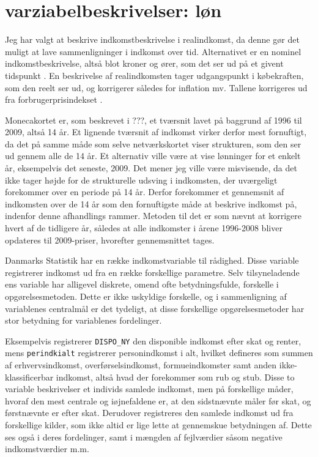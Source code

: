 
\newpage \section{varziabelbeskrivelser: løn \label{app_loen}}

Jeg har valgt at beskrive indkomstbeskrivelse i realindkomst, da denne gør det muligt at lave sammenligninger i indkomst over tid. Alternativet er en nominel indkomstbeskrivelse, altså blot kroner og ører, som det ser ud på et givent tidspunkt \parencite[6]{DST2009}. 
En beskrivelse af realindkomsten tager udgangspunkt i købekraften, som den reelt ser ud, og korrigerer således for inflation mv. Tallene korrigeres ud fra forbrugerprisindekset \parencite{DSTPRISINDEKS}. 

Monecakortet er, som beskrevet i ???, et tværsnit lavet på baggrund af 1996 til 2009, altså 14 år. Et lignende tværsnit af indkomst virker derfor mest fornuftigt, da det på samme måde som selve netværkskortet viser strukturen, som den ser ud gennem alle de 14 år. Et alternativ ville være at vise lønninger for et enkelt år, eksempelvis det seneste, 2009. Det mener jeg ville være misvisende, da det ikke tager højde for de strukturelle udsving i indkomsten, der uværgeligt forekommer over en periode på 14 år. Derfor forekommer et gennemsnit af indkomsten over de 14 år som den fornuftigste måde at beskrive indkomst på, indenfor denne afhandlings rammer. Metoden til det er som nævnt at korrigere hvert af de tidligere år, således at alle indkomster i årene 1996-2008 bliver opdateres til 2009-priser, hvorefter gennemsnittet tages. 

Danmarks Statistik har en række indkomstvariable til rådighed. Disse variable registrerer indkomst ud fra en række forskellige parametre. Selv tilsyneladende ens variable har alligevel diskrete, omend ofte betydningsfulde, forskelle i opgørelsesmetoden. Dette er ikke uskyldige forskelle, og i sammenligning af variablenes centralmål er det tydeligt, at disse forskellige opgørelsesmetoder har stor betydning for variablenes fordelinger.

Eksempelvis registrerer \texttt{DISPO\_NY} den disponible indkomst efter skat og renter, mens \texttt{perindkialt} registrerer personindkomst i alt, hvilket defineres som summen af erhvervsindkomst, overførselsindkomst, formueindkomster samt anden ikke-klassificerbar indkomst, altså hvad der forekommer som rub og stub. Disse to variable beskrivelser et individs samlede indkomst, men på forskellige måder, hvoraf den mest centrale og iøjnefaldene er, at den sidstnævnte måler før skat, og førstnævnte er efter skat. Derudover registreres den samlede indkomst ud fra forskellige kilder, som ikke altid er lige lette at gennemskue betydningen af. Dette ses også i deres fordelinger, samt i mængden af fejlværdier såsom negative indkomstværdier m.m.

